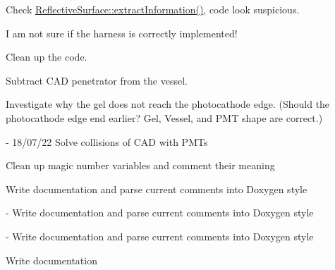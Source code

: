 
\begin{DoxyRefList}
\item[Member \mbox{\hyperlink{classabc_data_file_afa294a5fd58c6c3911d1a57683f7688a}{abc\+Data\+File\+::abc\+Data\+File}} (G4\+String p\+File\+Name)]\label{todo__todo000001}%
%
Check \mbox{\hyperlink{class_reflective_surface_a5dff8f89e20cf4e629024fe3a1b1d78f}{Reflective\+Surface\+::extract\+Information()}}, code look suspicious.  
\item[Member \mbox{\hyperlink{class_d_e_g_g_a93dc17fd3d8523e54ad70a42925ff4f1}{DEGG\+::DEGG}} (\mbox{\hyperlink{class_input_data_manager}{Input\+Data\+Manager}} $\ast$p\+Data, G4bool p\+Place\+Harness=true)]\label{todo__todo000004}%
%

\begin{DoxyItemize}
\item I am not sure if the harness is correctly implemented!
\item Clean up the code.
\item Subtract CAD penetrator from the vessel.
\item Investigate why the gel does not reach the photocathode edge. (Should the photocathode edge end earlier? Gel, Vessel, and PMT shape are correct.)  
\end{DoxyItemize}
\item[Member \mbox{\hyperlink{class_l_o_m16_a93c141790620554394cdf9864096d011}{LOM16\+::$\sim$\+LOM16}} ()]\label{todo__todo000005}%
%
-\/ 18/07/22 Solve collisions of CAD with PMTs
\begin{DoxyItemize}
\item Clean up magic number variables and comment their meaning
\item Write documentation and parse current comments into Doxygen style  
\end{DoxyItemize}
\item[Member \mbox{\hyperlink{classm_d_o_m_afd95205edb92f86b5c8d4e5642a58e3c}{m\+DOM\+::$\sim$m\+DOM}} ()]\label{todo__todo000007}%
%
-\/ Write documentation and parse current comments into Doxygen style  
\item[Member \mbox{\hyperlink{classm_d_o_m_harness_aa192aa85786a58ad121567fbb7a78f06}{m\+DOMHarness\+::m\+DOMHarness}} (\mbox{\hyperlink{classm_d_o_m}{m\+DOM}} $\ast$p\+MDOM, \mbox{\hyperlink{class_input_data_manager}{Input\+Data\+Manager}} $\ast$p\+Data)]\label{todo__todo000008}%
%
-\/ Write documentation and parse current comments into Doxygen style  
\item[File \mbox{\hyperlink{_o_m_sim_d_e_g_g_harness_8hh}{OMSim\+DEGGHarness.hh}} ]\label{todo__todo000003}%
%
Write documentation



\end{DoxyRefList}
